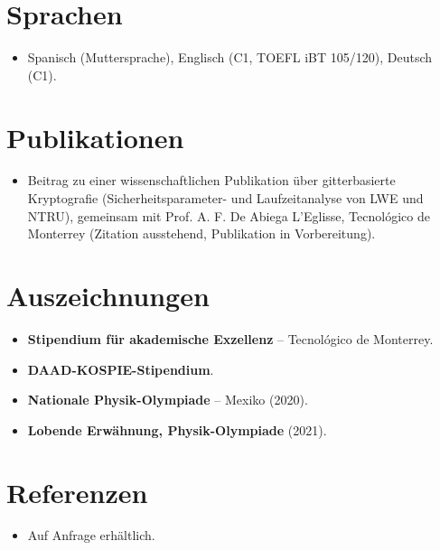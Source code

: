 \documentclass[11pt,a4paper,sans]{moderncv}
\begin{document}

\section{Sprachen}
\vspace{1pt}
\begin{itemize}
\item Spanisch (Muttersprache), Englisch (C1, TOEFL iBT 105/120), Deutsch (C1).
\end{itemize}


\section{Publikationen}
\vspace{1pt}
\begin{itemize}
\item Beitrag zu einer wissenschaftlichen Publikation über gitterbasierte Kryptografie (Sicherheitsparameter- und Laufzeitanalyse von LWE und NTRU), gemeinsam mit Prof. A. F. De Abiega L'Eglisse, Tecnológico de Monterrey (Zitation ausstehend, Publikation in Vorbereitung).
\end{itemize}


\section{Auszeichnungen}
\vspace{1pt}
\begin{itemize}
\item{\textbf{Stipendium für akademische Exzellenz} -- Tecnológico de Monterrey.}
\item{\textbf{DAAD-KOSPIE-Stipendium}.}
\item{\textbf{Nationale Physik-Olympiade} -- Mexiko (2020).}
\item{\textbf{Lobende Erwähnung, Physik-Olympiade} (2021).}
\end{itemize}


\section{Referenzen}
\vspace{1pt}
\begin{itemize}
\item{Auf Anfrage erhältlich.}
\end{itemize}
\end{document}
